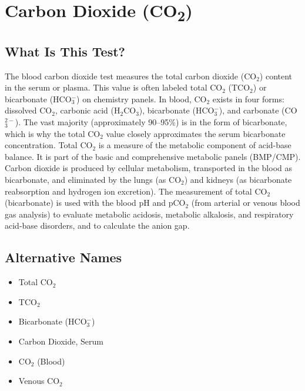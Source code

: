 \chapter{Carbon Dioxide (CO\textsubscript{2})}

\section*{What Is This Test?}
The blood carbon dioxide test measures the total carbon dioxide (CO$_2$) content in the serum or plasma. This value is often labeled total CO$_2$ (TCO$_2$) or bicarbonate (HCO$_3^-$) on chemistry panels. In blood, CO$_2$ exists in four forms: dissolved CO$_2$, carbonic acid (H$_2$CO$_3$), bicarbonate (HCO$_3^-$), and carbonate (CO$_3^{2-}$). The vast majority (approximately 90--95\%) is in the form of bicarbonate, which is why the total CO$_2$ value closely approximates the serum bicarbonate concentration. Total CO$_2$ is a measure of the metabolic component of acid-base balance. It is part of the basic and comprehensive metabolic panels (BMP/CMP). Carbon dioxide is produced by cellular metabolism, transported in the blood as bicarbonate, and eliminated by the lungs (as CO$_2$) and kidneys (as bicarbonate reabsorption and hydrogen ion excretion). The measurement of total CO$_2$ (bicarbonate) is used with the blood pH and pCO$_2$ (from arterial or venous blood gas analysis) to evaluate metabolic acidosis, metabolic alkalosis, and respiratory acid-base disorders, and to calculate the anion gap.

\section*{Alternative Names}
\begin{itemize}
  \item Total CO$_2$
  \item TCO$_2$
  \item Bicarbonate (HCO$_3^-$)
  \item Carbon Dioxide, Serum
  \item CO$_2$ (Blood)
  \item Venous CO$_2$
\end{itemize}
